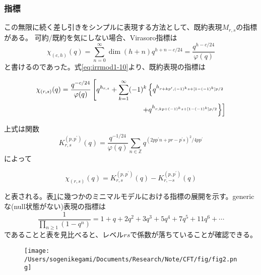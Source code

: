 \documentclass[11pt, aps, longbibliography]{article}
\numberwithin{equation}{section}
\begin{document}
        \subsubsection{指標}
        この無限に続く差し引きをシンプルに表現する方法として、既約表現$M_{r,s}$の指標がある。
        可約/既約を気にしない場合、Virasoro指標は
        \begin{equation}\label{eq:irrmod2-1}
            \chi_{(c,h)}(q) = \sum_{n=0}^\infty \dim(h+n)q^{h+n-c/24} = \frac{q^{h-c/24}}{\varphi(q)}
        \end{equation}
        と書けるのであった。式\eqref{eq:irrmod1-10}より、既約表現の指標は
        \begin{tcolorbox}
            \begin{align}\label{eq:irrmod2-2}
                \chi_{(r,s)}(q) = \frac{q^{-c/24}}{\varphi(q)} \left[ q^{h_{r,s}} + \sum_{k=1}^\infty (-1)^k  \left\{ q^{h_{r+kp^\prime,(-1)^ks+[1-(-1)^k]p/2}} \right. \right. \\
                \left.\left.  +q^{h_{r,kp+(-1)^ks+[1-(-1)^k]p/2}}  \right\}  \right] \notag
            \end{align}
        \end{tcolorbox}
        上式は関数
        \begin{equation}\label{eq:irrmod2-3}
            K_{r,s}^{(p,p^\prime)}(q) = \frac{q^{-1/24}}{\varphi(q)}\sum_{n\in \mathbb{Z}} q^{(2pp^\prime n+pr-p^\prime s)^2/4pp^\prime}
        \end{equation}
        によって
        \begin{tcolorbox}
            \begin{equation}\label{eq:irrmod2-4}
                \chi_{(r,s)}(q) = K_{r,s}^{(p,p^\prime)}(q) - K_{r,-s}^{(p,p^\prime)}(q)
            \end{equation}
        \end{tcolorbox}
        と表される。表\ref{fig2}に幾つかのミニマルモデルにおける指標の展開を示す。genericな(null状態がない)表現の指標は
        \begin{equation}\label{eq:irrmod2-5}
            \frac{1}{\prod_{n\geq 1}(1-q^n)} = 1 + q + 2q^2 + 3q^3 + 5q^4 + 7q^5+11q^6 + \cdots
        \end{equation}
        であることと表を見比べると、レベル$rs$で係数が落ちていることが確認できる。
        \begin{figure}[t]
            \centering
            \texttt{[image: /Users/sogenikegami/Documents/Research/Note/CFT/fig/fig2.png]}
            \caption{}
            \label{fig2}
        \end{figure}
\end{document}
